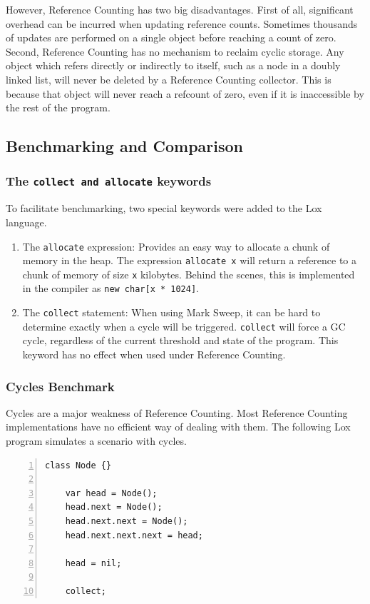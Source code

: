 \documentclass[10pt]{extarticle}
\begin{document}
However, Reference Counting has two big disadvantages. First of all, significant overhead can be incurred when updating reference counts. Sometimes thousands of updates are performed on a single object before reaching a count of zero. Second, Reference Counting has no mechanism to reclaim cyclic storage. Any object which refers directly or indirectly to itself, such as a node in a doubly linked list, will never be deleted by a Reference Counting collector. This is because that object will never reach a refcount of zero, even if it is inaccessible by the rest of the program.

\subsection{Benchmarking and Comparison}

\subsubsection{The \lstinline{collect and allocate} keywords}

To facilitate benchmarking, two special keywords were added to the Lox language.

\begin{enumerate}
    \item The \lstinline{allocate} expression: Provides an easy way to allocate a chunk of memory in the heap. The expression \lstinline{allocate x} will return a reference to a chunk of memory of size \lstinline{x} kilobytes. Behind the scenes, this is implemented in the compiler as \lstinline{new char[x * 1024]}.
    \item The \lstinline{collect} statement: When using Mark Sweep, it can be hard to determine exactly when a cycle will be triggered. \lstinline{collect} will force a GC cycle,  regardless of the current threshold and state of the program. This keyword has no effect when used under Reference Counting. 
\end{enumerate}

\subsubsection{Cycles Benchmark}

Cycles are a major weakness of Reference Counting. Most Reference Counting implementations have no efficient way of dealing with them. The following Lox program simulates a scenario with cycles.

\begin{lstlisting}[numbers=left]
    class Node {}

    var head = Node();
    head.next = Node();
    head.next.next = Node();
    head.next.next.next = head;

    head = nil;

    collect;
\end{lstlisting}
\end{document}
